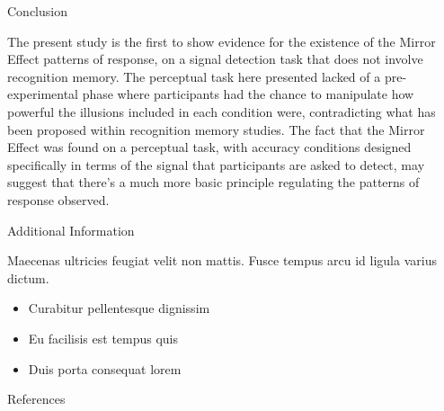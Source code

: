 \documentclass[final]{beamer}
\newlength{\onecolwid}
\begin{document}
\begin{frame}[t]
\begin{columns}[t]
\begin{column}{\onecolwid}

\begin{block}{Conclusion}

The present study is the first to show evidence for the existence of the Mirror Effect patterns of response, on a signal detection task that does not involve recognition memory. The perceptual task here presented lacked of a pre-experimental phase where participants had the chance to manipulate how powerful the illusions included in each condition were, contradicting what has been proposed within recognition memory studies. The fact that the Mirror Effect was found on a perceptual task, with accuracy conditions designed specifically in terms of the signal that participants are asked to detect, may suggest that there’s a much more basic principle regulating the patterns of response observed.

\end{block}


\begin{block}{Additional Information}

Maecenas ultricies feugiat velit non mattis. Fusce tempus arcu id ligula varius dictum. 
\begin{itemize}
\item Curabitur pellentesque dignissim
\item Eu facilisis est tempus quis
\item Duis porta consequat lorem
\end{itemize}

\end{block}


\begin{block}{References}

\nocite{*} %
\small{
\vspace{0.75in}}


\end{block}
\end{column}
\end{columns}
\end{frame}
\end{document}
